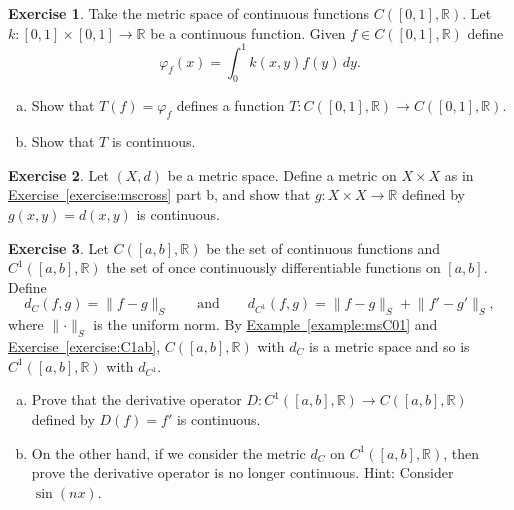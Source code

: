 \documentclass[12pt,openany]{book}
\newcommand{\snorm}[1]{\lVert {#1} \rVert}
\newcommand{\R}{{\mathbb{R}}}
\theoremstyle{plain}
\theoremstyle{remark}
\theoremstyle{definition}
\newenvironment{exbox}{%
    \def\FrameCommand{\vrule width 1pt \relax\hspace{10pt}}%
    \MakeFramed{\advance\hsize-\width\FrameRestore}%
}{%
    \endMakeFramed
}
\newenvironment{exparts}{%
    \leavevmode\begin{enumerate}[a),noitemsep,topsep=0pt,parsep=0pt,partopsep=0pt]
}{%
    \end{enumerate}
}
\theoremstyle{exercise}
\newtheorem{exercise}{Exercise}[section]
\theoremstyle{example}
\newcommand{\exerciseref}[1]{\hyperref[#1]{Exercise~\ref*{#1}}}
\newcommand{\exampleref}[1]{\hyperref[#1]{Example~\ref*{#1}}}
\begin{document}
\begin{exbox}
\begin{exercise} \label{exercise:continuousintoperator}
Take the metric space of continuous functions $C([0,1],\R)$.  Let
$k \colon [0,1] \times [0,1] \to \R$ be a continuous function.
Given $f \in C([0,1],\R)$ define
\begin{equation*}
\varphi_f(x) = \int_0^1 k(x,y) f(y)  \, dy .
\end{equation*}
\begin{exparts}
\item
Show that $T(f) = \varphi_f$ defines a function $T \colon C([0,1],\R) \to
C([0,1],\R)$.
\item
Show that $T$ is continuous.
\end{exparts}
\end{exercise}

\begin{exercise} \label{exercise:metriccontinuous}
Let $(X,d)$ be a metric space.
Define a metric on $X \times X$ as in \exerciseref{exercise:mscross} part
b, and show that $g \colon X \times X \to \R$ defined by
$g(x,y) = d(x,y)$ is continuous.
\end{exercise}

\begin{exercise}
Let $C([a,b],\R)$ be the set of continuous functions and
$C^1([a,b],\R)$ the set of once continuously differentiable
functions on $[a,b]$.
Define
\begin{equation*}
d_{C}(f,g) = \snorm{f-g}_S
\qquad \text{and} \qquad
d_{C^1}(f,g) = \snorm{f-g}_S + \snorm{f'-g'}_S,
\end{equation*}
where $\snorm{\cdot}_S$ is the uniform norm.
By \exampleref{example:msC01} and \exerciseref{exercise:C1ab},
$C([a,b],\R)$ with $d_C$ is a metric space and
so is
$C^1([a,b],\R)$ with $d_{C^1}$.
\begin{exparts}
\item
Prove that the derivative operator $D \colon 
C^1([a,b],\R) \to C([a,b],\R)$ defined by
$D(f) = f'$ is continuous.
\item
On the other hand, if we consider the metric $d_C$ on $C^1([a,b],\R)$,
then prove the derivative operator is no longer continuous.  Hint: Consider
$\sin(n x)$.
\end{exparts}
\end{exercise}


\end{exbox}
\end{document}
